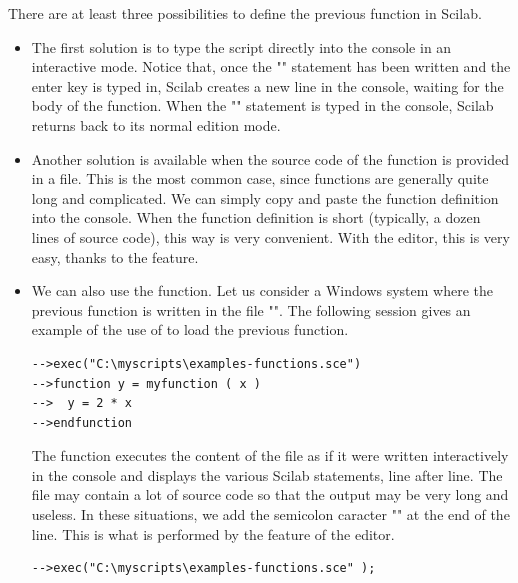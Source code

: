 There are at least three possibilities to define the previous
function in Scilab.
\begin{itemize}
\item The first solution is to type the script directly into the console
in an interactive mode. Notice that, once the "" 
statement has been written and the enter key is typed in, Scilab 
creates a new line in the console, waiting for the body of the function.
When the "" statement is typed in the console, Scilab returns back to 
its normal edition mode. 

\item Another solution is available when the source code of the function
is provided in a file. This is the most common case, since functions 
are generally quite long and complicated. We can simply copy and paste 
the function definition into the console. When the function definition 
is short (typically, a dozen lines of source code), this way is very 
convenient. With the editor, this is very easy, thanks to the  
feature.

\item We can also use the  function. Let us consider a Windows system where the previous 
function is written in the file "".
The following session gives an example of the use of  to load the 
previous function.
\lstset{language=scilabscript}
\begin{lstlisting}
-->exec("C:\myscripts\examples-functions.sce")
-->function y = myfunction ( x )
-->  y = 2 * x
-->endfunction
\end{lstlisting}

The  function executes the content of the file as if 
it were written interactively in the console and displays the various 
Scilab statements, line after line.
The file may contain a lot of source code so that the output may
be very long and useless. In these situations, we add the semicolon caracter "\scivar{;}" at
the end of the line.
This is what is performed by the  feature of the editor.
\lstset{language=scilabscript}
\begin{lstlisting}
-->exec("C:\myscripts\examples-functions.sce" );
\end{lstlisting}

\end{itemize}

